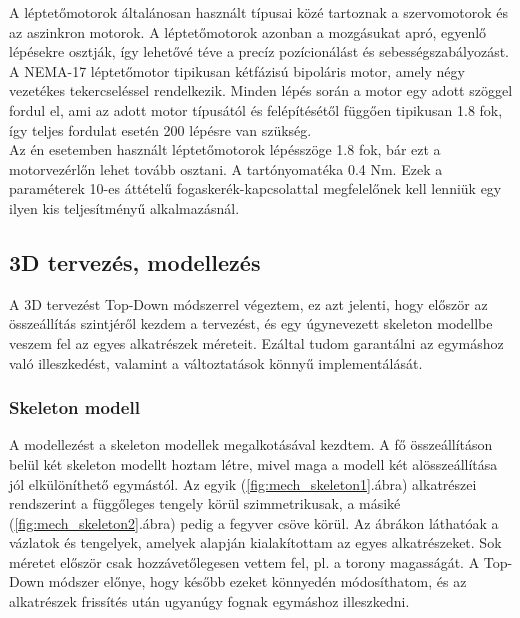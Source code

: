 \documentclass[12pt,a4paper]{article}
\begin{document}
A léptetőmotorok általánosan használt típusai közé tartoznak a szervomotorok és az aszinkron motorok. A léptetőmotorok azonban a mozgásukat apró, egyenlő lépésekre osztják, így lehetővé téve a precíz pozícionálást és sebességszabályozást. A NEMA-17 léptetőmotor tipikusan kétfázisú bipoláris motor, amely négy vezetékes tekercseléssel rendelkezik. Minden lépés során a motor egy adott szöggel fordul el, ami az adott motor típusától és felépítésétől függően tipikusan 1.8 fok, így teljes fordulat esetén 200 lépésre van szükség.\\

Az én esetemben használt léptetőmotorok lépésszöge 1.8 fok, bár ezt a motorvezérlőn lehet tovább osztani. A tartónyomatéka 0.4 Nm. Ezek a paraméterek 10-es áttételű fogaskerék-kapcsolattal megfelelőnek kell lenniük egy ilyen kis teljesítményű alkalmazásnál.
\subsection{3D tervezés, modellezés}
A 3D tervezést Top-Down módszerrel végeztem, ez azt jelenti, hogy először az összeállítás szintjéről kezdem a tervezést, és egy úgynevezett skeleton modellbe veszem fel az egyes alkatrészek méreteit. Ezáltal tudom garantálni az egymáshoz való illeszkedést, valamint a változtatások könnyű implementálását.\\
\subsubsection*{Skeleton modell}
A modellezést a skeleton modellek megalkotásával kezdtem. A fő összeállításon belül két skeleton modellt hoztam létre, mivel maga a modell két alösszeállítása jól elkülöníthető egymástól. Az egyik (\ref{fig:mech_skeleton1}.ábra) alkatrészei rendszerint a függőleges tengely körül szimmetrikusak, a másiké (\ref{fig:mech_skeleton2}.ábra) pedig a fegyver csöve körül. Az ábrákon láthatóak a vázlatok és tengelyek, amelyek alapján kialakítottam az egyes alkatrészeket. Sok méretet először csak hozzávetőlegesen vettem fel, pl. a torony magasságát. A Top-Down módszer előnye, hogy később ezeket könnyedén módosíthatom, és az alkatrészek frissítés után ugyanúgy fognak egymáshoz illeszkedni.
\end{document}
